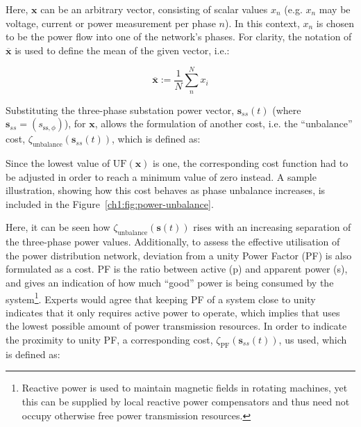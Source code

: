 

Here, $\textbf{x}$ can be an arbitrary vector, consisting of scalar values $x_n$ (e.g. $x_n$ may be voltage, current or power measurement per phase $n$).
In this context, $x_n$ is chosen to be the power flow into one of the network's phases.
For clarity, the notation of $\overline{\textbf{x}}$ is used to define the mean of the given vector, i.e.:

\begin{equation}
	\overline{\textbf{x}} := \frac{1}{N}\sum_n^N{x_i}
\end{equation}


Substituting the three-phase substation power vector, $\textbf{s}_{ss}(t)$ (where $\textbf{s}_{ss} = (s_{\text{ss},\phi})$), for $\textbf{x}$, allows the formulation of another cost, i.e. the ``unbalance'' cost, $\zeta_\text{unbalance}(\textbf{s}_{ss}(t))$, which is defined as:



Since the lowest value of $\text{UF}(\textbf{x})$ is one, the corresponding cost function had to be adjusted in order to reach a minimum value of zero instead.
A sample illustration, showing how this cost behaves as phase unbalance increases, is included in the Figure~\ref{ch1:fig:power-unbalance}.




Here, it can be seen how $\zeta_\text{unbalance}(\textbf{s}(t))$ rises with an increasing separation of the three-phase power values.
Additionally, to assess the effective utilisation of the power distribution network, deviation from a unity Power Factor (PF) is also formulated as a cost.
PF is the ratio between active (p) and apparent power (s), and gives an indication of how much ``good'' power is being consumed by the system\footnote{Reactive power is used to maintain magnetic fields in rotating machines, yet this can be supplied by local reactive power compensators and thus need not occupy otherwise free power transmission resources.}.
Experts would agree that keeping PF of a system close to unity indicates that it only requires active power to operate, which implies that uses the lowest possible amount of power transmission resources.
In order to indicate the proximity to unity PF, a corresponding cost, $\zeta_\text{PF}(\textbf{s}_{ss}(t))$, us used, which is defined as:


